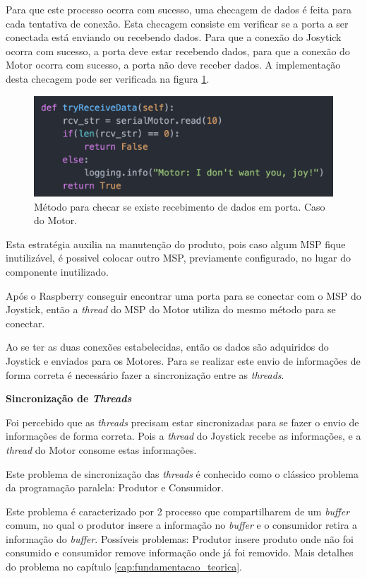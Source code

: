   Para que este processo ocorra com sucesso, uma checagem de dados é feita para cada tentativa de conexão. Esta checagem consiste em verificar se a porta a ser conectada está enviando ou recebendo dados. Para que a conexão do Josytick ocorra com sucesso, a porta deve estar recebendo dados, para que a conexão do Motor ocorra com sucesso, a porta não deve receber dados. A implementação desta checagem pode ser verificada na figura \ref{fig:try_receive_data}.

  \begin{figure}[!htb]
  \centering
  \includegraphics[keepaspectratio=true,scale=0.5]{figuras/resultados/try_receive_data}
  \caption{Método para checar se existe recebimento de dados em porta. Caso do Motor.}
  \label{fig:try_receive_data}
  \end{figure}

  Esta estratégia auxilia na manutenção do produto, pois caso algum MSP fique inutilizável, é possivel colocar outro MSP, previamente configurado, no lugar do componente inutilizado.

  Após o Raspberry conseguir encontrar uma porta para se conectar com o MSP do Joystick, então a \textit{thread} do MSP do Motor utiliza do mesmo método para se conectar.

  Ao se ter as duas conexões estabelecidas, então os dados são adquiridos do Joystick e enviados para os Motores. Para se realizar este envio de informações de forma correta é necessário fazer a sincronização entre as \textit{threads}.

  \textbf{Sincronização de \textit{Threads}}

  Foi percebido que as \textit{threads} precisam estar sincronizadas para se fazer o envio de informações de forma correta. Pois a \textit{thread} do Joystick recebe as informações, e a \textit{thread} do Motor consome estas informações.

  Este problema de sincronização das \textit{threads} é conhecido como o clássico problema da programação paralela: Produtor e Consumidor.

  Este problema é caracterizado por 2 processo que compartilharem de um \textit{buffer} comum, no qual o produtor insere a informação no \textit{buffer} e o consumidor retira a informação do \textit{buffer}. Possíveis problemas: Produtor insere produto onde não foi consumido e consumidor remove informação onde já foi removido. Mais detalhes do problema no capítulo \ref{cap:fundamentacao_teorica}.

